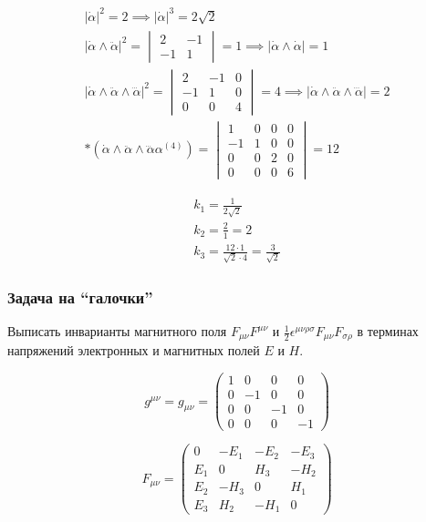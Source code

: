 $$\begin{gather}
|\dot{\alpha}|^{2} = 2 \implies |\dot{\alpha}|^{3} = 2\sqrt{ 2 } \\
|\dot{\alpha} \wedge\ddot{\alpha}|^{2} = \begin{vmatrix}
2 & -1 \\
-1 & 1
\end{vmatrix} = 1 \implies |\dot{\alpha} \wedge \dot{\alpha}| = 1 \\
|\dot{\alpha} \wedge \ddot{\alpha} \wedge \dddot{\alpha}|^{2} = \begin{vmatrix}
2 & -1 & 0 \\
-1 & 1 & 0 \\
0 & 0 & 4
\end{vmatrix} = 4 \implies |\dot{\alpha} \wedge \ddot{\alpha} \wedge \dddot{\alpha}| = 2 \\
*(\dot{\alpha} \wedge \ddot{\alpha} \wedge \dddot{\alpha} \alpha^{(4)}) = \begin{vmatrix}
1 & 0 & 0 & 0 \\
-1 & 1 & 0 & 0 \\
0 & 0 & 2 & 0 \\
0 & 0 & 0 & 6
\end{vmatrix} = 12
\end{gather}$$

$$\begin{gather}
k_{1} = \frac{1}{2\sqrt{ 2 }} \\
k_{2} = \frac{2}{1} = 2 \\
k_{3} = \frac{12\cdot 1}{\sqrt{ 2 } \cdot 4} = \frac{3}{\sqrt{ 2 }}
\end{gather}$$

\subsubsection{Задача на ``галочки''}

Выписать инварианты магнитного поля \(F_{\mu \nu}F^{\mu \nu}\) и
\(\frac{1}{2}\epsilon^{\mu \nu \rho \sigma}F_{\mu \nu}F_{\sigma \rho}\)
в терминах напряжений электронных и магнитных полей \(E\) и \(H\).

$$g^{\mu \nu} = g_{\mu \nu} = \begin{pmatrix}
1 & 0 & 0 & 0 \\
0 & -1 & 0 & 0 \\
0 & 0 & -1 & 0 \\
0 & 0 & 0 & -1
\end{pmatrix}$$

$$F_{\mu \nu} = \begin{pmatrix}
0 & -E_{1} & -E_{2} & -E_{3} \\
E_{1} & 0 & H_{3} & -H_{2} \\
E_{2} & -H_{3} & 0 & H_{1} \\
E_{3} & H_{2} & -H_{1} & 0
\end{pmatrix}$$

